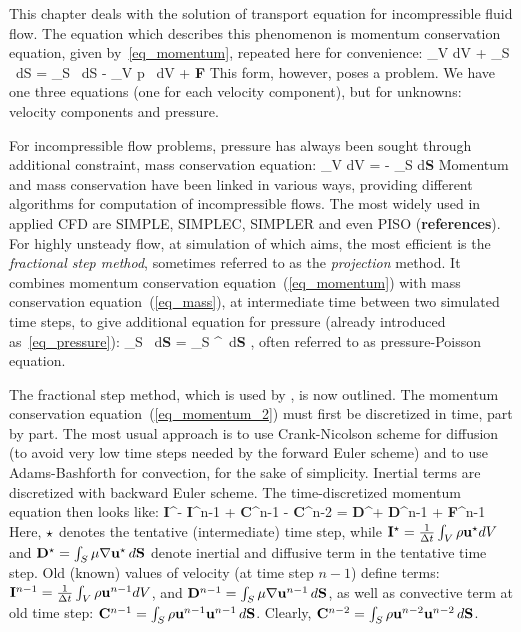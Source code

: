 \label{chap_single_phase}

This chapter deals with the solution of transport equation for incompressible
fluid flow. The equation which describes this phenomenon is momentum
conservation equation, given by~\ref{eq_momentum}, repeated here for
convenience:
%
\be
         \int_V  dV
       + \int_S \rho \uvw \uvw \, dS
       = \int_S \mu \nabla \uvw \, dS
       - \int_V \nabla p \, dV
       + {\bf F}
       \; \; \; \;
       [N]
  \label{eq_momentum_2}
\ee
%
This form, however,
poses a problem. We have one three equations (one for each velocity 
component), but for unknowns: velocity components and pressure. 

For incompressible flow problems, pressure has always been sought through
additional constraint, mass conservation equation:
%
\be
       \int_V  dV 
       = 
       - \int_S \rho \uvw d{\bf S}
       \; \; \; \;
       [\frac{kg}{s}]
  \label{eq_mass}
\ee
% 
Momentum and mass conservation have been linked in various ways, providing
different algorithms for computation of incompressible flows. The most
widely used in applied CFD are SIMPLE, SIMPLEC, SIMPLER and even PISO 
({\bf references}). For highly unsteady flow, at simulation of which
{\psiboil} aims, the most efficient is the {\em fractional step method},
sometimes referred to as the {\em projection} method. It combines momentum
conservation equation~(\ref{eq_momentum}) with mass conservation
equation~(\ref{eq_mass}), at intermediate time between two simulated
time steps, to give additional equation for pressure (already introduced
as~\ref{eq_pressure}):
%
\be
         \int_S  \, d{\bf S} 
       =  \int_S \uvw^\s \, d{\bf S}
       \; \; \; \; 
       [ \frac{m^3}{s^2} ],
  \label{eq_pressure_2}
\ee
%
often referred to as pressure-Poisson equation.

The fractional step method, which is used by {\psiboil}, is now outlined.
The momentum conservation equation~(\ref{eq_momentum_2}) must first be discretized
in time, part by part. The most usual approach is to use Crank-Nicolson
scheme for diffusion (to avoid very low time steps needed by the forward
Euler scheme) and to use Adams-Bashforth for convection, for the sake
of simplicity. Inertial terms are discretized with backward Euler scheme.
The time-discretized momentum equation then looks like:
%
\be
        {\bf I}^\s - {\bf I}^{n-1} 
       +  {\bf C}^{n-1} -  {\bf C}^{n-2}
       =  {\bf D}^\s +  {\bf D}^{n-1}
       + {\bf F}^{n-1}
  \label{eq_semi}
\ee
%
Here, $\star$ denotes the tentative (intermediate) time step, while 
${\bf I}^\star = \frac{1}{\Delta t} \int_V  \rho {\bf u}^\star dV$ 
and ${\bf D}^\star = \int_S \mu \nabla {\bf u}^\star \, d{\bf S}$ 
denote inertial and diffusive term in the tentative time step. 
Old (known) values of velocity (at time step $n-1$) define terms:
${\bf I}^{n-1} = \frac{1}{\Delta t} \int_V  \rho {\bf u}^{n-1} dV$,
and ${\bf D}^{n-1} = \int_S \mu \nabla {\bf u}^{n-1} \, d{\bf S}$, as well
as convective term at old time step: 
${\bf C}^{n-1} = \int_S \rho {\bf u}^{n-1}{\bf u}^{n-1} \, d{\bf S}$. Clearly,
${\bf C}^{n-2} = \int_S \rho {\bf u}^{n-2}{\bf u}^{n-2} \, d{\bf S}$.

